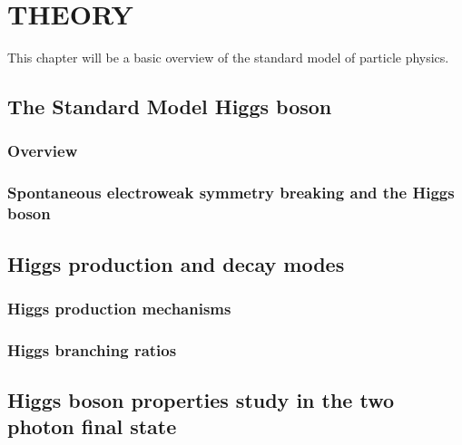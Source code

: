 %
%

\chapter{THEORY}
This chapter will be a basic overview of the standard model of particle physics.
\section{The Standard Model Higgs boson}
\subsection{Overview}
\subsection{Spontaneous electroweak symmetry breaking and the Higgs boson}
\section{Higgs production and decay modes}
\subsection{Higgs production mechanisms}
\subsection{Higgs branching ratios}
\section{Higgs boson properties study in the two photon final state}
